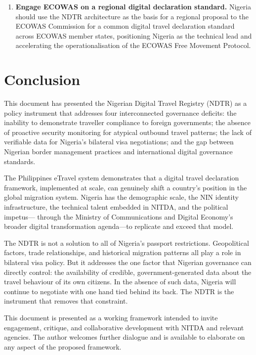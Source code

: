 \documentclass[11pt]{article}
\begin{document}
\begin{enumerate}[label=\textbf{R\arabic*.}, leftmargin=*, itemsep=6pt]
  \item \textbf{Engage ECOWAS on a regional digital declaration standard.}
  Nigeria should use the NDTR architecture as the basis for a regional
  proposal to the ECOWAS Commission for a common digital travel
  declaration standard across ECOWAS member states, positioning Nigeria
  as the technical lead and accelerating the operationalisation of the
  ECOWAS Free Movement Protocol.

\end{enumerate}

\section{Conclusion}
\label{sec:conclusion}

This document has presented the Nigerian Digital Travel Registry (NDTR)
as a policy instrument that addresses four interconnected governance
deficits: the inability to demonstrate traveller compliance to foreign
governments; the absence of proactive security monitoring for atypical
outbound travel patterns; the lack of verifiable data for Nigeria's
bilateral visa negotiations; and the gap between Nigerian border
management practices and international digital governance standards.

The Philippines eTravel system demonstrates that a digital travel
declaration framework, implemented at scale, can genuinely shift
a country's position in the global migration system.
Nigeria has the demographic scale, the NIN identity infrastructure,
the technical talent embedded in NITDA, and the political impetus---
through the Ministry of Communications and Digital Economy's
broader digital transformation agenda---to replicate and exceed
that model.

The NDTR is not a solution to all of Nigeria's passport restrictions.
Geopolitical factors, trade relationships, and historical migration
patterns all play a role in bilateral visa policy.
But it addresses the one factor that Nigerian governance can
directly control: the availability of credible, government-generated
data about the travel behaviour of its own citizens.
In the absence of such data, Nigeria will continue to negotiate
with one hand tied behind its back.
The NDTR is the instrument that removes that constraint.

This document is presented as a working framework intended to invite
engagement, critique, and collaborative development with NITDA and
relevant agencies. The author welcomes further dialogue and is
available to elaborate on any aspect of the proposed framework.
\end{document}
